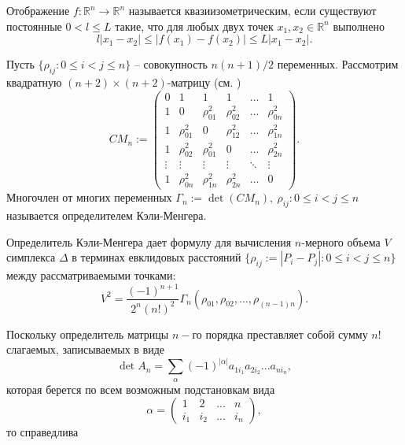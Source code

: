 \documentclass[a4paper,11pt,twoside]{article}
\begin{document}
\begin{dfn}
Отображение $f:\mathbb{R}^n \to \mathbb{R}^n$ называется квазиизометрическим, если существуют постоянные $0 < l \leqslant L$ такие, что для любых двух точек $x_1, x_2 \in \mathbb{R}^n$ выполнено
\begin{equation*}
l\vert x_1-x_2\vert \leqslant \vert f(x_1)-f(x_2)\vert \leqslant L\vert x_1-x_2\vert.
\end{equation*}
\end{dfn}

\begin{dfn}
Пусть $\{\rho_{ij}:0 \leqslant i<j \leqslant n \}$ -- совокупность $n(n+1)/2$ переменных. Рассмотрим квадратную $(n+2)\times (n+2)$-матрицу (см. \cite{Shur-Berg})
\begin{equation*}
CM_n:=\left( \begin{array}{cccccc} 
0 & 1 & 1 & 1 & \ldots & 1 \\
1 & 0 & \rho_{01}^2 & \rho_{02}^2 & \ldots & \rho_{0n}^2 \\
1 & \rho_{01}^2 & 0 & \rho_{12}^2 & \ldots & \rho_{1n}^2 \\
1 & \rho_{02}^2 & \rho_{01}^2 & 0 & \ldots & \rho_{2n}^2 \\
\vdots & \vdots & \vdots & \vdots & \ddots & \vdots \\
1 & \rho_{0n}^2 & \rho_{1n}^2 & \rho_{2n}^2 & \ldots & 0
\end{array} \right).
\end{equation*}
Многочлен от многих переменных $\Gamma _n:= \det (CM_n), \: \rho_{ij}:0 \leqslant i<j \leqslant n$ называется определителем Кэли-Менгера. 
\end{dfn}
Определитель Кэли-Менгера дает формулу для вычисления $n$-мерного объема $V$ симплекса $\Delta$ в терминах евклидовых расстояний $\{\rho_{ij}:= |P_i-P_j|:0 \leqslant i<j \leqslant n \}$ между рассматриваемыми точками:
\begin{equation} \label{volum}
V^2=\dfrac{(-1)^{n+1}}{2^n(n!)^2} \Gamma_n(\rho_{01},\rho_{02}, \ldots,\rho_{(n-1)n}).
\end{equation}

Поскольку определитель матрицы $n-$го порядка преставляет собой сумму $n!$ слагаемых, записываемых в виде
\begin{equation*}
\det A_n= \sum_{\alpha} (-1)^{| \alpha|}a_{1i_1}a_{2i_2}...a_{ni_n},
\end{equation*}
которая берется по всем возможным подстановкам вида
$$\alpha = \left( \begin{array}{cccc}
1 & 2 & ... & n \\
i_1& i_2& ...&i_n
\end{array} \right),$$
то справедлива
\end{document}
